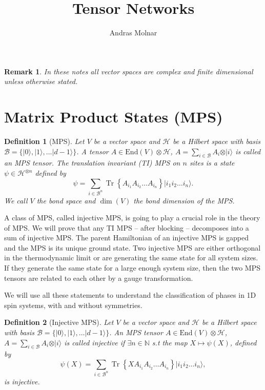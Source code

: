 \documentclass{article}
\title{Tensor Networks}
\author{Andras Molnar}
\newtheorem{remark}{Remark}
\newtheorem{definition}{Definition}
\newcommand{\tr}{\operatorname{Tr}}
\newcommand{\End}{\mathrm{End}}
\newcommand{\ket}[1]{\vert #1 \rangle}
\begin{document}
\maketitle

\begin{remark}
	In these notes all vector spaces are complex and finite dimensional unless otherwise stated.
\end{remark}


\section{Matrix Product States (MPS)}

\begin{definition}[MPS]
  Let $V$ be a vector space and $\mathcal{H}$ be a Hilbert space with basis $\mathcal{B} = \{\ket{0},\ket{1},\dots \ket{d-1}\}$. A tensor $A\in \End(V)\otimes \mathcal{H}$, $A = \sum_{i\in \mathcal{B}} A_i \otimes \ket{i}$ is called an MPS tensor. The translation invariant (TI) MPS on $n$ sites is a state $\psi\in \mathcal{H}^{\otimes n}$ defined by
  \begin{equation*}
  	\psi = \sum_{i\in \mathcal{B}^n} \tr\left\{A_{i_1} A_{i_2} \dots A_{i_n}\right\} \ket{i_1 i_2 \dots i_n}.
  \end{equation*}
  We call $V$ the bond space and $\dim(V)$ the bond dimension of the MPS.
\end{definition}

A class of MPS, called injective MPS, is going to play a crucial role in the theory of MPS. We will prove that any TI MPS -- after blocking -- decomposes into a sum of injective MPS. The parent Hamiltonian of an injective MPS is gapped and the MPS is its unique ground state. Two injective MPS are either orthogonal in the thermodynamic limit or are generating the same state for all system sizes. If they generate the same state for a large enough system size, then the two MPS tensors are related to each other by a gauge transformation. 

We will use all these statements to understand the classification of phases in 1D spin systems, with and without symmetries.

\begin{definition}[Injective MPS]
  Let $V$ be a vector space and $\mathcal{H}$ be a Hilbert space with basis $\mathcal{B} = \{\ket{0},\ket{1},\dots \ket{d-1}\}$. An MPS tensor $A\in \End(V)\otimes \mathcal{H}$, $A = \sum_{i\in \mathcal{B}} A_i \otimes \ket{i}$ is called \emph{injective} if $\exists n\in\mathbb{N}$ s.t the map $X\mapsto \psi(X)$, defined by
  \begin{equation*}
    \psi(X) = \sum_{i\in \mathcal{B}^n} \tr\left\{XA_{i_1} A_{i_2} \dots A_{i_n}\right\} \ket{i_1 i_2 \dots i_n},
  \end{equation*}
  is injective.
\end{definition}
\end{document}
